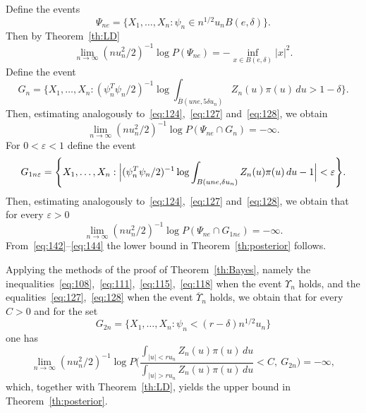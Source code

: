 \documentclass[11pt,a4paper]{article}
\begin{document}
Define the events
\begin{equation}
\Psi_{ne}=\{X_1,\dots,X_n:\psi_n\in n^{1/2}u_n B(e,\delta)\}.
\label{eq:141}
\end{equation}
Then by Theorem~\ref{th:LD}
\begin{equation}
\lim_{n\to\infty}(nu_n^2/2)^{-1}\log P(\Psi_{ne})=-\inf_{x\in B(e,\delta)}|x|^2.
\label{eq:142}
\end{equation}
Define the event
\begin{equation}
G_n=\Biggl\{X_1,\dots,X_n:(\psi_n^T\psi_n/2)^{-1}\log\int_{\overline{B}(une,5\delta u_n)}Z_n(u)\pi(u)\,du>1-\delta\Biggr\}.
\end{equation}
Then, estimating analogously to~\eqref{eq:124},~\eqref{eq:127} and~\eqref{eq:128}, we obtain
\begin{equation}
\lim_{n\to\infty}(nu_n^2/2)^{-1}\log P(\Psi_{ne}\cap G_n)=-\infty.
\label{eq:143}
\end{equation}
For $0<\varepsilon<1$ define the event
\begin{equation}
G_{1n\varepsilon}=\Biggl\{X_1,\dots,X_n:\Bigl|(\psi_n^T\psi_n/2)^{-1}\log\int_{B(une,\delta u_n)}Z_n(u)\pi(u)\,du-1\Bigr|<\varepsilon\Biggr\}.
\end{equation}
Then, estimating analogously to~\eqref{eq:124},~\eqref{eq:127} and~\eqref{eq:128}, we obtain that for every $\varepsilon>0$
\begin{equation}
\lim_{n\to\infty}(nu_n^2/2)^{-1}\log P(\Psi_{ne}\cap G_{1n\varepsilon})=-\infty.
\label{eq:144}
\end{equation}
From~\eqref{eq:142}--\eqref{eq:144} the lower bound in Theorem~\ref{th:posterior} follows.

Applying the methods of the proof of Theorem~\ref{th:Bayes}, namely the inequalities~\eqref{eq:108},~\eqref{eq:111},~\eqref{eq:115},~\eqref{eq:118} when the event $\Upsilon_n$ holds, and the equalities~\eqref{eq:127},~\eqref{eq:128} when the event $\overline{\Upsilon}_n$ holds, we obtain that for every $C>0$ and for the set
\begin{equation}
G_{2n}=\{X_1,\dots,X_n:\psi_n<(r-\delta)n^{1/2}u_n\}
\label{eq:145}
\end{equation}
one has
\begin{equation}
\lim_{n\to\infty}(nu_n^2/2)^{-1}\log P\Biggl(\frac{\displaystyle\int_{|u|<ru_n}Z_n(u)\pi(u)\,du}{\displaystyle\int_{|u|>ru_n}Z_n(u)\pi(u)\,du}<C,\ G_{2n}\Biggr)=-\infty,
\label{eq:146}
\end{equation}
which, together with Theorem~\ref{th:LD}, yields the upper bound in Theorem~\ref{th:posterior}.
\end{document}
